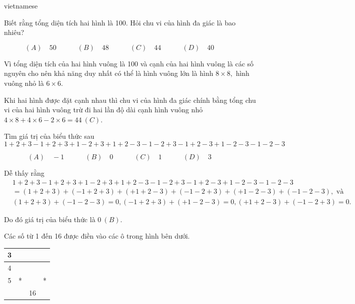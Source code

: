 \documentclass{article}
\begin{document}
\begin{otherlanguage*}{vietnamese}
\begin{problem*}[PI-2024-C-P6]
    Biết rằng tổng diện tích hai hình là 100. Hỏi chu vi của hình đa giác là bao nhiêu?

    \[
        (A) \quad 50 \qquad \quad
        (B) \quad 48 \qquad \quad
        (C) \quad 44 \qquad \quad
        (D) \quad 40 \qquad \quad
    \]
\end{problem*}

\begin{soln}
    Vì tổng diện tích của hai hình vuông là 100 và cạnh của hai hình vuông là các số nguyên cho nên khả năng duy nhất có thể là hình vuông lớn là hình $8 \times 8,$
    hình vuông nhỏ là $6 \times 6.$
    
    Khi hai hình được đặt cạnh nhau thì chu vi của hình đa giác chính bằng tổng chu vi của hai hình vuông trừ đi hai lần độ dài cạnh hình vuông nhỏ
    $4 \times 8 + 4 \times 6 - 2\times 6 = \boxed{44\ (C).}$
\end{soln}

\bigbreak

\begin{problem*}[PI-2024-C-P7]
    \label{problem:pi-2024-c-p7}

    Tìm giá trị của biểu thức sau
    \[
        1+2+3-1+2+3+1-2+3+1+2-3-1-2+3-1+2-3+1-2-3-1-2-3
    \]

    \[
        (A) \quad -1 \qquad \quad
        (B) \quad 0 \qquad \quad
        (C) \quad 1 \qquad \quad
        (D) \quad 3 \qquad \quad
    \]
\end{problem*}

\begin{soln}
    Dễ thấy rằng
    \[
        \begin{aligned}
            &1+2+3-1+2+3+1-2+3+1+2-3-1-2+3-1+2-3+1-2-3-1-2-3\\
            &=(1+2+3)+(-1+2+3)+(+1+2-3)+(-1-2+3)+(+1-2-3)+(-1-2-3), \text{\ và}\\
            &(1+2+3) + (-1-2-3) = 0,(-1+2+3) + (+1-2-3) = 0,(+1+2-3) + (-1-2+3) = 0.
        \end{aligned}
    \]
    
    Do đó giá trị của biểu thức là $\boxed{0\ (B).}$
\end{soln}

\bigbreak

\begin{problem*}[PI-2024-C-P8]
    \label{problem:pi-2024-c-p8}

    Các số từ 1 đến 16 được điền vào các ô trong hình bên dưới.
    \begin{center}
        \begin{tabular}{|c|c|c|c|}
        \hline
        3 &   &    &   \\ \hline
        4 &   &    &   \\ \hline
        5 & * &    & * \\ \hline
          &   & 16 &   \\ \hline
        \end{tabular}
    \end{center}


\end{problem*}
\end{otherlanguage*}
\end{document}
